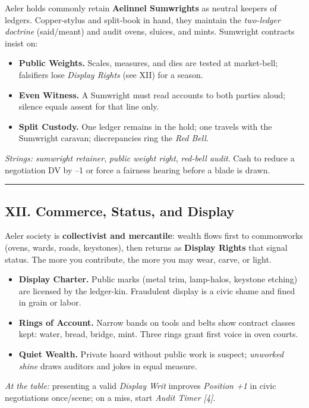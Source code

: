 \documentclass[11pt]{article}
\begin{document}
Aeler holds commonly retain \textbf{Aelinnel Sumwrights} as neutral keepers of ledgers. Copper-stylus and split-book in hand, they maintain the \emph{two-ledger doctrine} (said/meant) and audit ovens, sluices, and mints. Sumwright contracts insist on:
\begin{itemize}[leftmargin=*]
  \item \textbf{Public Weights.} Scales, measures, and dies are tested at market-bell; falsifiers lose \emph{Display Rights} (see XII) for a season.
  \item \textbf{Even Witness.} A Sumwright must read accounts to both parties aloud; silence equals assent for that line only.
  \item \textbf{Split Custody.} One ledger remains in the hold; one travels with the Sumwright caravan; discrepancies ring the \emph{Red Bell}.
\end{itemize}
\textit{Strings:} \emph{sumwright retainer}, \emph{public weight right}, \emph{red-bell audit}. Cash to reduce a negotiation DV by --1 or force a fairness hearing before a blade is drawn.

\medskip\hrule\medskip

\subsection{XII. Commerce, Status, and Display}

Aeler society is \textbf{collectivist and mercantile}: wealth flows first to commonworks (ovens, wards, roads, keystones), then returns as \textbf{Display Rights} that signal status. The more you contribute, the more you may wear, carve, or light.
\begin{itemize}[leftmargin=*]
  \item \textbf{Display Charter.} Public marks (metal trim, lamp-halos, keystone etching) are licensed by the ledger-kin. Fraudulent display is a civic shame and fined in grain or labor.
  \item \textbf{Rings of Account.} Narrow bands on tools and belts show contract classes kept: water, bread, bridge, mint. Three rings grant first voice in oven courts.
  \item \textbf{Quiet Wealth.} Private hoard without public work is suspect; \emph{unworked shine} draws auditors and jokes in equal measure.
\end{itemize}
\textit{At the table:} presenting a valid \emph{Display Writ} improves \emph{Position +1} in civic negotiations once/scene; on a miss, start \emph{Audit Timer [4]}.
\end{document}
